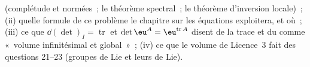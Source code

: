 \begin{problem}
\begin{enumerate}[resume]
        (complétude et  normées~; le théorème spectral~;
        le théorème d'inversion locale)~; (ii) quelle formule de ce
        problème le chapitre sur les équations 
        exploitera, et où~; (iii) ce que $\dd(\det)_I =
        \operatorname{tr}$ et $\det\eu^A =
        \eu^{\operatorname{tr}A}$ disent de la trace et du
         comme «~volume infinitésimal et global~»~;
        (iv) ce que le volume de Licence~3 fait des questions
        21--23 (groupes de Lie et leurs  de Lie).
\end{enumerate}
\end{problem}
